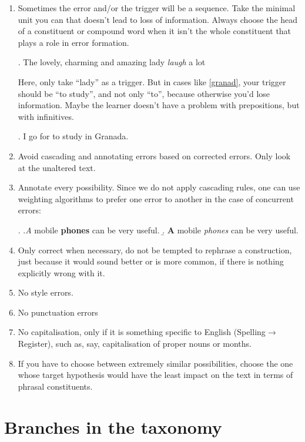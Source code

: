 \documentclass[12pt]{article}
\begin{document}
\begin{enumerate}
\item Sometimes the error and/or the trigger will be a sequence. Take the
minimal unit you can that doesn't lead to loss of information. Always choose
the head of a constituent or compound word when it isn't the whole 
constituent that plays a role in error formation.

\ex.  The lovely, charming and amazing lady \textit{laugh} a lot 

Here, only take ``lady'' as a trigger. But in cases like \ref{granad}, your
trigger should be ``to study'', and not only ``to'', because otherwise you'd lose
information.  Maybe the learner doesn't have a problem with prepositions, but with infinitives.

\ex. I go for to study in Granada.\label{granad}

\item Avoid cascading and annotating errors based on corrected errors. Only look at the unaltered text.

\item Annotate every possibility. Since we do not apply cascading rules, one can use weighting algorithms to prefer one error to another in the case of concurrent errors:

\ex. \a.\textit{A} mobile \textbf{phones} can be very useful. 
\b. \textbf{A} mobile \textit{phones} can be very useful. 


\item Only correct when necessary, do not be tempted to rephrase a construction,
just because it would sound better or is more common, if there is nothing
explicitly wrong with it.

\item No style errors.

\item No punctuation errors

\item No capitalisation, only if it is something specific to English
(Spelling$\to$Register), such as, say, capitalisation of proper nouns or months.

\item If you have to choose between extremely similar possibilities, choose the
one whose target hypothesis would have the least impact on the text in terms of
phrasal constituents.

\end{enumerate}

\section{Branches in the taxonomy}\label{branches}
\end{document}
